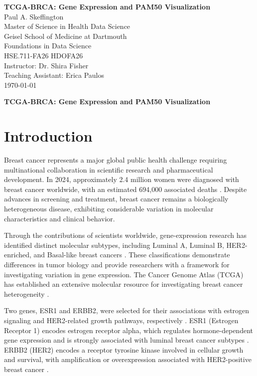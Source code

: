 \documentclass[12pt,letterpaper]{article}
\newcommand{\papertitle}{TCGA-BRCA: Gene Expression and PAM50 Visualization}
\begin{document}
\begin{titlepage}
\thispagestyle{fancy}
\vspace*{1.6in}
\begin{center}
\textbf{\papertitle}\\[2\baselineskip]
Paul A. Skeffington\\
Master of Science in Health Data Science\\
Geisel School of Medicine at Dartmouth\\[\baselineskip]
Foundations in Data Science\\
HSE.711-FA26 \textbar{} HDOFA26\\
Instructor: Dr. Shira Fisher\\
Teaching Assistant: Erica Paulos\\[\baselineskip]
\today
\end{center}
\end{titlepage}
\setcounter{page}{2}
\begin{center}\textbf{\papertitle}\end{center}




\section*{Introduction}

Breast cancer represents a major global public health challenge requiring multinational collaboration in scientific research and pharmaceutical development. In 2024, approximately 2.4 million women were diagnosed with breast cancer worldwide, with an estimated 694,000 associated deaths \parencite{who2026breast}. Despite advances in screening and treatment, breast cancer remains a biologically heterogeneous disease, exhibiting considerable variation in molecular characteristics and clinical behavior.

Through the contributions of scientists worldwide, gene-expression research has identified distinct molecular subtypes, including Luminal A, Luminal B, HER2-enriched, and Basal-like breast cancers \parencite{parker2009}. These classifications demonstrate differences in tumor biology and provide researchers with a framework for investigating variation in gene expression. The Cancer Genome Atlas (TCGA) has established an extensive molecular resource for investigating breast cancer heterogeneity \parencite{tcga2012}.

Two genes, ESR1 and ERBB2, were selected for their associations with estrogen signaling and HER2-related growth pathways, respectively \parencite{tcga2012}. ESR1 (Estrogen Receptor 1) encodes estrogen receptor alpha, which regulates hormone-dependent gene expression and is strongly associated with luminal breast cancer subtypes \parencite{parker2009}. ERBB2 (HER2) encodes a receptor tyrosine kinase involved in cellular growth and survival, with amplification or overexpression associated with HER2-positive breast cancer \parencite{tcga2012}.
\end{document}
